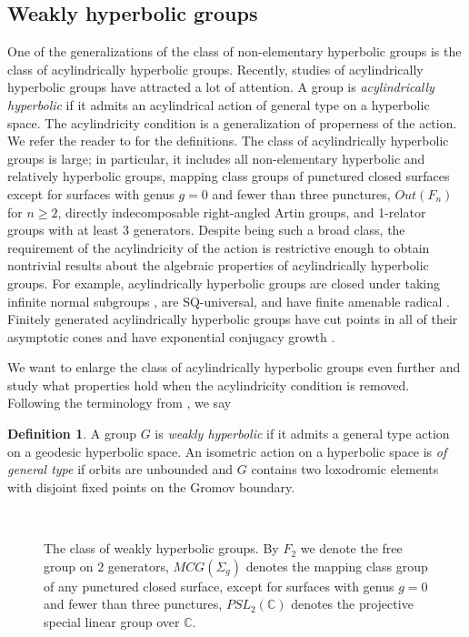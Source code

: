\documentclass[11pt,letterpaper]{article}
\newcommand{\CC}{\mathbb{C}}
\theoremstyle{definition}
\newtheorem{defn}[thm]{Definition}
\theoremstyle{remark}
\begin{document}
\subsection{Weakly hyperbolic groups}
One of the generalizations of the class of non-elementary hyperbolic groups is the class of acylindrically hyperbolic groups. Recently, studies of acylindrically hyperbolic groups have attracted a lot of attention. A group is {\it acylindrically hyperbolic} if it admits an acylindrical action of general type on a hyperbolic space. The acylindricity condition is a generalization of properness of the action. We refer the reader to \cite{Osi16} for the definitions. The class of acylindrically hyperbolic groups is large; in particular, it includes all non-elementary hyperbolic and relatively hyperbolic groups, mapping class groups of punctured closed surfaces except for surfaces with genus $g=0$ and fewer than three punctures, $Out(F_n)$ for $n \geq 2$, directly indecomposable right-angled Artin groups, and 1-relator groups with at least 3 generators. Despite being such a broad class, the requirement of the acylindricity of the action is restrictive enough to obtain nontrivial results about the algebraic properties of acylindrically hyperbolic groups. For example, acylindrically hyperbolic groups are closed under taking infinite normal subgroups \cite{Osi16}, are SQ-universal, and have finite amenable radical \cite{DGO}. Finitely generated acylindrically hyperbolic groups have cut points in all of their asymptotic cones \cite{Sis} and have exponential conjugacy growth \cite{HO13}. 

We want to enlarge the class of acylindrically hyperbolic groups even further and study what properties hold when the acylindricity condition is removed. Following the terminology from \cite{MT}, we say
\begin{defn}
A group $G$ is {\it weakly hyperbolic} if it admits a general type action on a geodesic hyperbolic space. An isometric action on a hyperbolic space is {\it of general type} if orbits are unbounded and $G$ contains two loxodromic elements with disjoint fixed points on the Gromov boundary.
\end{defn}

\begin{figure}
  \centering\\
   \caption{The class of weakly hyperbolic groups. By $F_2$ we denote the free group on $2$ generators, $MCG(\Sigma_g)$ denotes the mapping class group of any punctured closed surface, except for surfaces with genus
$g=0$ and fewer than three punctures, $PSL_2(\CC)$ denotes the projective special linear group over $\CC$.}\label{classes inclusion}
\end{figure}
\end{document}
